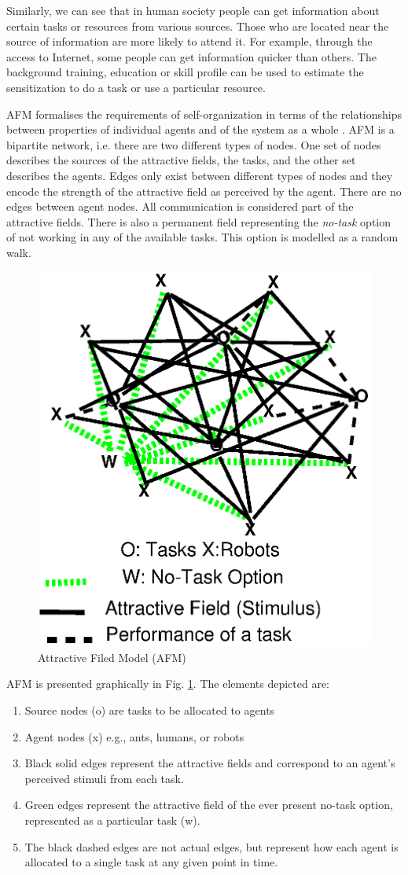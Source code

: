 \documentclass[smallcondensed]{svjour3}
\begin{document}
Similarly, we can see that in human society people can get information about certain tasks or resources from various sources. Those who are located near the source of information are more likely to attend it. For example, through the access to Internet, some people can get information quicker than others.  The background training, education or skill profile can be used to estimate the sensitization to do a task or use a particular resource. 

AFM formalises the requirements of self-organization in terms of the relationships between properties of individual agents and of the system as a whole \citep{Arcaute+2008}.  AFM is a bipartite network, i.e. there are two different types of nodes.  One set of nodes describes the sources of the attractive fields, the tasks, and the other set describes the agents.  Edges only exist between different types of nodes and they encode the strength of the attractive field as perceived by the agent.  There are no edges between agent nodes.  All communication is considered part of the attractive fields.  There is also a permanent field representing the {\em no-task} option of not working in any of the available tasks.  This option is modelled as a random walk.  
\begin{figure}[htp]
\centering
\includegraphics[height=0.5\textwidth, angle=0]{./images/AFM-Diag3.eps}
\caption{\small Attractive Filed Model (AFM)}
\label{fig:afm} 
\end{figure}
AFM is presented graphically in Fig. \ref{fig:afm}.  The elements depicted are:
\begin{enumerate}
\item Source nodes (o) are tasks to be allocated to agents
\item Agent nodes (x) e.g., ants, humans, or robots
\item Black solid edges represent the attractive fields and correspond to an agent's perceived stimuli from each task.
\item Green edges represent the attractive field of the ever present no-task option, represented as a particular task (w).
\item The black dashed edges are not actual edges, but represent how each agent is allocated to a single task at any given point in time.
\end{enumerate}
\end{document}

